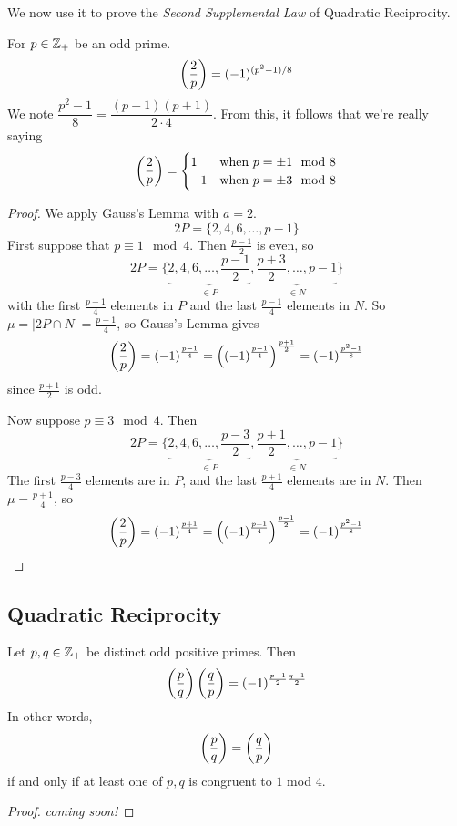 We now use it to prove the \emph{Second Supplemental Law} of Quadratic Reciprocity.
\begin{proposition}
    For $p\in\mathbb Z_+$ be an odd prime.
    \[\left(\dfrac{2}{p}\right) = (-1)^{(p^2 - 1)/8}\]
    We note $\dfrac{p^2-1}{8} = \dfrac{(p-1)(p+1)}{2\cdot 4}$. From this, it follows that we're really saying
    \[\left(\dfrac{2}{p}\right) = \begin{cases}
            1  & \text{when $p = \pm 1\mod 8$} \\
            -1 & \text{when $p = \pm 3\mod 8$}
        \end{cases}\]
\end{proposition}
\begin{proof}
    We apply Gauss's Lemma with $a = 2$.
    \[2P = \{2, 4, 6, \dots, p-1\}\]
    First suppose that $p\equiv 1\mod 4$. Then $\frac{p-1}{2}$ is even, so
    \[2P = \bigg\{\underbrace{2, 4, 6, \dots, \frac{p-1}{2}}_{\in P}, \underbrace{\frac{p+3}{2}, \dots, p-1}_{\in N}\bigg\}\]
    with the first $\frac{p-1}{4}$ elements in $P$ and the last $\frac{p-1}{4}$ elements in $N$. So $\mu = |2P\cap N| = \frac{p-1}{4}$, so Gauss's Lemma gives
    \[\left(\dfrac{2}{p}\right)
        = (-1)^{\frac{p-1}{4}}
        = \left((-1)^{\frac{p-1}{4}}\right)^{\frac{p+1}{2}}
        = (-1)^{\frac{p^2-1}{8}}\]
    since $\frac{p+1}{2}$ is odd.

    Now suppose $p\equiv 3\mod 4$. Then
    \[2P = \bigg\{\underbrace{2, 4, 6, \dots, \frac{p-3}{2}}_{\in P}, \underbrace{\frac{p+1}{2}, \dots, p-1}_{\in N}\bigg\}\]
    The first $\frac{p-3}{4}$ elements are in $P$, and the last $\frac{p+1}{4}$ elements are in $N$. Then $\mu = \frac{p+1}{4}$, so
    \[\left(\dfrac{2}{p}\right)
        = (-1)^{\frac{p+1}{4}}
        = \left((-1)^{\frac{p+1}{4}}\right)^{\frac{p-1}{2}}
        = (-1)^{\frac{p^2-1}{8}}\]
\end{proof}

\subsection{Quadratic Reciprocity}
\begin{theorem}
    Let $p, q\in\mathbb Z_+$ be distinct odd positive primes. Then
    \begin{equation*}
        \left(\dfrac{p}{q}\right)\left(\dfrac{q}{p}\right) = (-1)^{\frac{p-1}{2}\frac{q-1}{2}}
    \end{equation*}
    In other words,
    \[\left(\dfrac{p}{q}\right) = \left(\dfrac{q}{p}\right)\]
    if and only if at least one of $p, q$ is congruent to $1$ mod $4$.
\end{theorem}
\begin{proof}
    \emph{coming soon!}
\end{proof}

